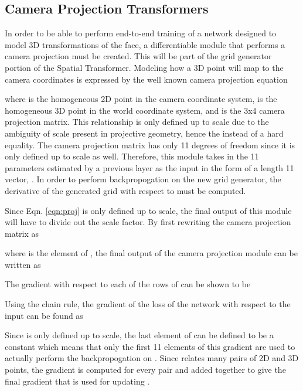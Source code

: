 \documentclass[10pt,twocolumn,letterpaper]{article}
\begin{document}
\subsection{Camera Projection Transformers}
\label{sec:CPT}
In order to be able to perform end-to-end training of a network designed to model 3D transformations of the face, a differentiable module that performs a camera projection must be created. This will be part of the grid generator portion of the Spatial Transformer. Modeling how a 3D point will map to the camera coordinates is expressed by the well known camera projection equation

where  is the homogeneous 2D point in the camera coordinate system,  is the homogeneous 3D point in the world coordinate system, and  is the 3x4 camera projection matrix. This relationship is only defined up to scale due to the ambiguity of scale present in projective geometry, hence the  instead of a hard equality. The camera projection matrix has only 11 degrees of freedom since it is only defined up to scale as well. Therefore, this module takes in the 11 parameters estimated by a previous layer as the input in the form of a length 11 vector, . In order to perform backpropogation on the new grid generator, the derivative of the generated grid with respect to  must be computed. 

Since Eqn. \ref{eqn:proj} is only defined up to scale, the final output of this module will have to divide out the scale factor. By first rewriting the camera projection matrix as

where  is the  element of , the final output of the camera projection module can be written as

The gradient with respect to each of the rows of  can be shown to be

Using the chain rule, the gradient of the loss of the network with respect to the input can be found as

Since  is only defined up to scale, the last element of  can be defined to be a constant which means that only the first 11 elements of this gradient are used to actually perform the backpropogation on . Since  relates many pairs of 2D and 3D points, the gradient is computed for every pair and added together to give the final gradient that is used for updating .
\end{document}
